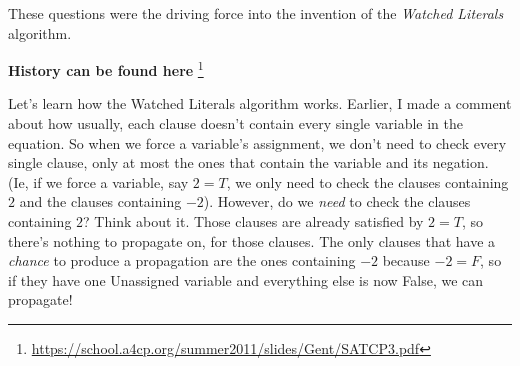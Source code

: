 \documentclass[oneside]{book}
\begin{document}
These questions were the driving force into the invention of the 
\textit{Watched Literals} algorithm.

\textbf{History can be found here}
\footnote{\url{https://school.a4cp.org/summer2011/slides/Gent/SATCP3.pdf}}

Let's learn how the Watched Literals algorithm works. Earlier, I made a comment 
about how usually, each clause doesn't contain every single variable in the 
equation. So when we force a variable's assignment, we don't need to check 
every single clause, only at most the ones that contain the variable and its 
negation. (Ie, if we force a variable, say $2 = T$, we only need to check the clauses 
containing $2$ and the clauses containing $-2$). However, do we \textit{need} to 
check the clauses containing $2$? Think about it. Those clauses are already 
satisfied by $2 = T$, so there's nothing to propagate on, for those clauses. 
The only clauses that have a \textit{chance} to produce a propagation are the 
ones containing $-2$ because $-2 = F$, so if they have one Unassigned variable 
and everything else is now False, we can propagate!
\end{document}
